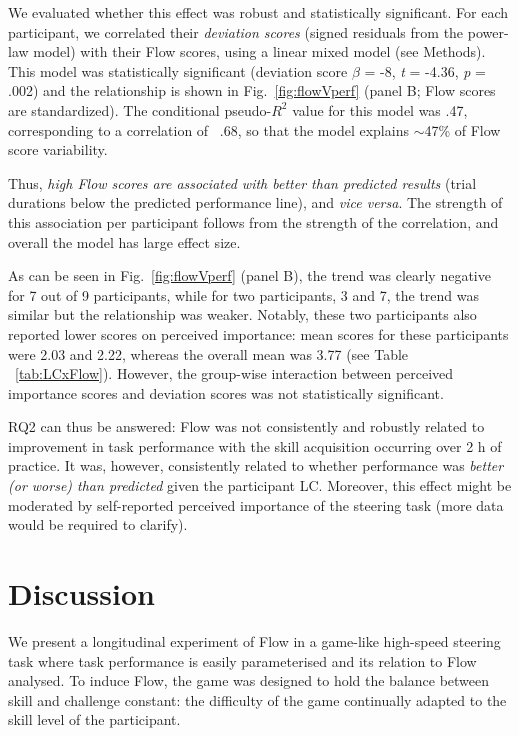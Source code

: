 \documentclass{frontierstyle/frontiersSCNS}
\begin{document}
We evaluated whether this effect was robust and statistically significant. For each participant, we correlated their {\it deviation scores} (signed residuals from the power-law model) with their Flow scores, using a linear mixed model (see Methods). This model was statistically significant (deviation score $\beta$ = -8, {\it t} = -4.36, {\it p} = .002) %
and the relationship is shown in Fig.~\ref{fig:flowVperf} (panel B; Flow scores are standardized). The conditional pseudo-$R^2$ value for this model was .47, corresponding to a correlation of ~.68, so that the model explains $\sim$47\% of Flow score variability.

Thus, {\it high Flow scores are associated with better than predicted results} (trial durations below the predicted performance line), and {\it vice versa}. The strength of this association per participant follows from the strength of the correlation, and overall the model has large effect size.

As can be seen in Fig.~\ref{fig:flowVperf} (panel B), the trend was clearly negative for 7 out of 9 participants, while for two participants, 3 and 7, the trend was similar but the relationship was weaker. Notably, these two participants also reported lower scores on perceived importance: mean scores for these participants were 2.03 and 2.22, whereas the overall mean was 3.77 (see Table ~\ref{tab:LCxFlow}). However, the group-wise interaction between perceived importance scores and deviation scores was not statistically significant.

RQ2 can thus be answered: Flow was not consistently and robustly related to improvement in task performance with the skill acquisition occurring over 2 h of practice. It was, however, consistently related to whether performance was {\it better (or worse) than predicted} given the participant LC. Moreover, this effect might be moderated by self-reported perceived importance of the steering task (more data would be required to clarify).



\section{Discussion}
We present a longitudinal experiment of Flow in a game-like high-speed steering task where task performance is easily parameterised and its relation to Flow analysed. %
To induce Flow, the game was designed to hold the balance between skill and challenge constant: the difficulty of the game continually adapted to the skill level of the participant.
\end{document}

